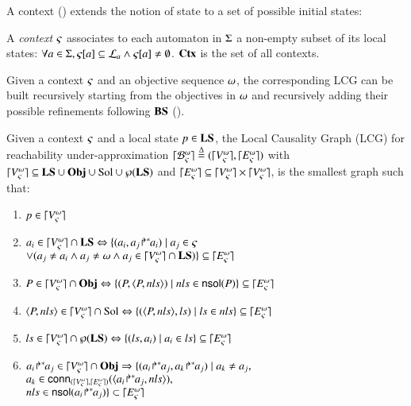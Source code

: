 A context () extends the notion of state to a set of possible initial states:
\begin{definition}
\label{def:context}
  A \emph{context} $\varsigma$ associates to each automaton in $\Sigma$ a non-empty subset of its local states:
  $\forall a \in \Sigma, {\varsigma[a]} \subseteq \mathcal{L}_a \wedge {\varsigma[a]} \neq \emptyset$.
  $\mathbf{Ctx}$ is the set of all contexts.
\end{definition}

Given a context $\varsigma$ and an objective sequence $\omega$, the corresponding LCG can be built
recursively starting from the objectives in $\omega$ and recursively adding their possible refinements
following $\mathbf{BS}$ ().

\begin{definition}
\label{def:glc}
Given a context $\varsigma$ and a local state $p\in \mathbf{LS}$,
the Local Causality Graph (LCG) for reachability under-approximation
$\lceil \mathcal{B}_{\varsigma}^{\omega}\rceil \stackrel{\Delta}= (\lceil V_\varsigma^\omega\rceil, \lceil E_\varsigma^\omega\rceil)$
with
$\lceil V_\varsigma^\omega\rceil \subseteq \mathbf{LS} \cup \mathbf{Obj} \cup \mathrm{Sol} \cup \wp(\mathbf{LS})$
and
$\lceil E_\varsigma^\omega\rceil \subseteq \lceil V_\varsigma^\omega\rceil \times \lceil V_\varsigma^\omega\rceil$,
is the smallest graph such that:
\begin{enumerate}
\item
$p \in \lceil V_\varsigma^\omega\rceil$
\item
$a_i\in\lceil V_\varsigma^\omega\rceil\cap\mathbf{LS} \Leftrightarrow \{ (a_i,{a_j\!\Rsh^*\!\!a_i}) \mid
a_j\in\varsigma$ \\
\hspace*{3cm}
$\vee (a_j\neq a_i\wedge a_j\neq\omega\wedge a_j\in\lceil V_\varsigma^\omega\rceil\cap\mathbf{LS})
\}\subseteq\lceil E_\varsigma^\omega\rceil$
\item
$P\in\lceil V_\varsigma^\omega\rceil\cap\mathbf{Obj} \Leftrightarrow 
	\{ (P,\langle P,nls\rangle) \mid nls\in\mathsf{nsol}(P) \}\subseteq\lceil E_\varsigma^\omega\rceil$
\item
$\langle P, nls \rangle\in\lceil V_\varsigma^\omega\rceil\cap\mathrm{Sol} \Leftrightarrow
	\{ (\langle P,nls\rangle, ls) \mid ls\in nls \}\subseteq\lceil E_\varsigma^\omega\rceil$
\item
$ls \in\lceil V_\varsigma^\omega\rceil\cap\wp(\mathbf{LS}) \Leftrightarrow
	\{ (ls, a_i) \mid a_i\in ls \}\subseteq\lceil E_\varsigma^\omega\rceil$
\item
$\obj{a_i}{a_j}\in \cwBNodes\cap\Obj \Rightarrow 
	\{(\obj{a_i}{a_j},\obj{a_k}{a_j}) \mid a_k\neq a_j,$
\\
\hspace*{4cm}
$a_k\in \mathsf{conn}_{(\lceil V_\varsigma^\omega\rceil,\lceil E_\varsigma^\omega\rceil)}(\langle{a_i\!\Rsh^*\!\!a_j},nls\rangle),$
\\
\hspace*{4cm}
$nls\in\mathsf{nsol}({a_i\!\Rsh^*\!\!a_j}) \}\subset\lceil E_\varsigma^\omega\rceil$
\end{enumerate}

\end{definition}


